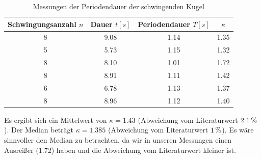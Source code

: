 \documentclass[a4paper,titlepage]{scrartcl}
\numberwithin{equation}{section}
\begin{document}
\begin{table}[H]
\begin{tabular}{c|c|c|c}
	Schwingungsanzahl $n$ & Dauer $t [s]$ & Periodendauer $T [s]$ & $\kappa$ \\
	\hline
	8 & 9.08 & 1.14 & 1.35 \\
	5 & 5.73 & 1.15 & 1.32 \\
	8 & 8.10 & 1.01 & 1.72 \\
	8 & 8.91 & 1.11 & 1.42 \\
	6 & 6.78 & 1.13 & 1.37 \\
	8 & 8.96 & 1.12 & 1.40 \\
\end{tabular}
\caption{Messungen der Periodendauer der schwingenden Kugel}
\label{tab:aufgabe3}
\end{table}
Es ergibt sich ein Mittelwert von $\kappa=1.43$ (Abweichung vom Literaturwert $\unit[2.1]{\%}$). Der Median beträgt $\kappa=1.385$ (Abweichung vom Literaturwert $\unit[1]{\%}$). Es wäre sinnvoller den Median zu betrachten, da wir in unseren Messungen einen Ausreißer (1.72) haben und die Abweichung vom Literaturwert kleiner ist.
\end{document}
